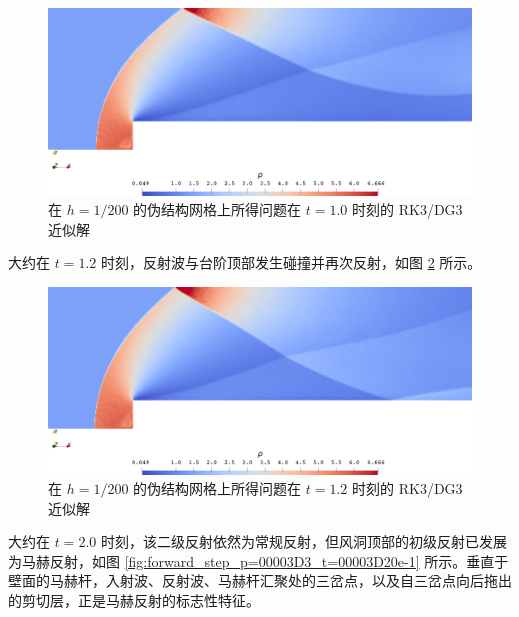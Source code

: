 \begin{figure}[h!]
\begin{centering}
\includegraphics[width=1\textwidth,height=0.28\textheight]{../mdpi/figures/forward_step/p=3_t=10e-1}
\par\end{centering}
\caption{\label{fig:forward_step_p=00003D3_t=00003D10e-1}在 $h=1/200$ 的伪结构网格上所得问题在
$t=1.0$ 时刻的 RK3/DG3 近似解}
\end{figure}

大约在 $t=1.2$ 时刻，反射波与台阶顶部发生碰撞并再次反射，如图 \ref{fig:forward_step_p=00003D3_t=00003D12e-1}
所示。

\begin{figure}[h!]
\begin{centering}
\includegraphics[width=1\textwidth,height=0.28\textheight]{../mdpi/figures/forward_step/p=3_t=12e-1}
\par\end{centering}
\caption{\label{fig:forward_step_p=00003D3_t=00003D12e-1}在 $h=1/200$ 的伪结构网格上所得问题在
$t=1.2$ 时刻的 RK3/DG3 近似解}
\end{figure}

大约在 $t=2.0$ 时刻，该二级反射依然为常规反射，但风洞顶部的初级反射已发展为马赫反射，如图 \ref{fig:forward_step_p=00003D3_t=00003D20e-1}
所示。垂直于壁面的马赫杆，入射波、反射波、马赫杆汇聚处的三岔点，以及自三岔点向后拖出的剪切层，正是马赫反射的标志性特征。

